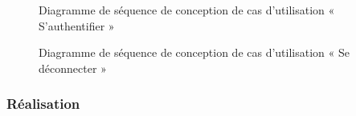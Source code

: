 \begin{figure}[H]
  \centering
  \caption{Diagramme de séquence de conception de cas d'utilisation « S'authentifier »}
  \label{fig:sequence_conception_login}
\end{figure}

\begin{figure}[H]
  \centering
  \caption{Diagramme de séquence de conception de cas d'utilisation « Se déconnecter »}
  \label{fig:sequence_conception_logout}
\end{figure}

\subsubsection{Réalisation}

